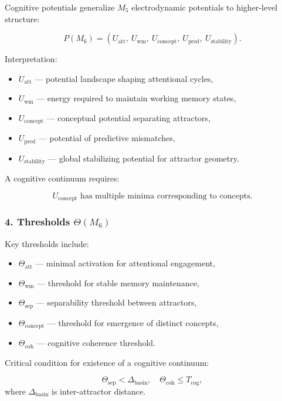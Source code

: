Cognitive potentials generalize $M_5$ electrodynamic potentials to higher-level structure:

\[
P(M_6) = 
(U_{\mathrm{att}},\
U_{\mathrm{wm}},\
U_{\mathrm{concept}},\
U_{\mathrm{pred}},\
U_{\mathrm{stability}}).
\]

Interpretation:

\begin{itemize}
    \item $U_{\mathrm{att}}$ — potential landscape shaping attentional cycles,
    \item $U_{\mathrm{wm}}$ — energy required to maintain working memory states,
    \item $U_{\mathrm{concept}}$ — conceptual potential separating attractors,
    \item $U_{\mathrm{pred}}$ — potential of predictive mismatches,
    \item $U_{\mathrm{stability}}$ — global stabilizing potential for attractor geometry.
\end{itemize}

A cognitive continuum requires:

\[
U_{\mathrm{concept}} \text{ has multiple minima corresponding to concepts}.
\]

\subsubsection*{4. Thresholds \texorpdfstring{$\Theta(M_6)$}{\Theta(M_6)}}

Key thresholds include:

\begin{itemize}
    \item $\Theta_{\mathrm{att}}$ — minimal activation for attentional engagement,
    \item $\Theta_{\mathrm{wm}}$ — threshold for stable memory maintenance,
    \item $\Theta_{\mathrm{sep}}$ — separability threshold between attractors,
    \item $\Theta_{\mathrm{concept}}$ — threshold for emergence of distinct concepts,
    \item $\Theta_{\mathrm{coh}}$ — cognitive coherence threshold.
\end{itemize}

Critical condition for existence of a cognitive continuum:

\[
\Theta_{\mathrm{sep}} < \Delta_{\mathrm{basin}},
\quad
\Theta_{\mathrm{coh}} \le T_{\mathrm{cog}},
\]
where $\Delta_{\mathrm{basin}}$ is inter-attractor distance.

